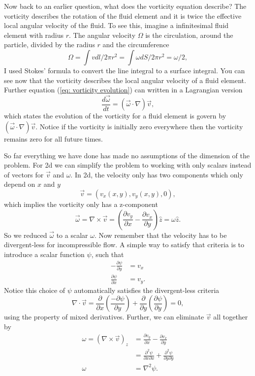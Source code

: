 \documentclass{article}
\begin{document}
Now back to an earlier question, what does the vorticity equation describe? The vorticity describes the rotation of the fluid element and it is twice the effective local angular velocity of the fluid. To see this, imagine a infinitesimal fluid element with radius $r$. The angular velocity $\Omega$ is the circulation, around the particle, divided by the radius $r$ and the circumference
\begin{equation*}
\Omega = \int v dl/2\pi r^2 = \int \omega dS/ 2\pi r^2 = \omega/2, 
\end{equation*}
I used Stokes' formula to convert the line integral to a surface integral. You can see now that the vorticity describes the local angular velocity of a fluid element. Further equation (\ref{eq: vorticity evolution}) can written in a Lagrangian version
\begin{equation*}
\frac{d\vec{\omega}}{dt} = (\vec{\omega}\cdot\nabla)\vec{v},
\end{equation*}
which states the evolution of the vorticity for a fluid element is govern by $(\vec{\omega}\cdot\nabla)\vec{v}$. Notice if the vorticity is initially zero everywhere then the vorticity remains zero for all future times.

So far everything we have done has made no assumptions of the dimension of the problem. For 2d we can simplify the problem to working with only scalars instead of vectors for $\vec{v}$ and $\omega$. In 2d, the velocity only has two components which only depend on $x$ and $y$
\begin{equation*}
\vec{v} = (v_x(x,y), v_y(x,y),0),
\end{equation*} 
which implies the vorticity only has a z-component
\begin{equation*}
\vec{\omega}=\nabla\times\vec{v} = \left(\frac{\partial v_y}{\partial x} - \frac{\partial v_x}{\partial y}\right)\hat{z} = \omega \hat{z}.
\end{equation*}
So we reduced $\vec{\omega}$ to a scalar $\omega$. Now remember that the velocity has to be divergent-less for incompressible flow. A simple way to satisfy that criteria is to introduce a scalar function $\psi$, such that
\begin{align*}
-\frac{\partial \psi}{\partial y} &= v_x\\
\frac{\partial \psi}{\partial x} &= v_y.
\end{align*}
Notice this choice of $\psi$ automatically satisfies the divergent-less criteria
\begin{equation}
\nabla\cdot\vec{v} = \frac{\partial}{\partial x}\left(\frac{-\partial \psi}{\partial y}\right) + \frac{\partial}{\partial y}\left(\frac{\partial \psi}{\partial y}\right) = 0,
\end{equation} 
using the property of mixed derivatives. Further, we can eliminate $\vec{v}$ all together by
\begin{align*}
\omega = (\nabla\times\vec{v})_z &= \frac{\partial v_y}{\partial x} - \frac{\partial v_x}{\partial y}\\
&=\frac{\partial^2 \psi}{\partial x\partial x} + \frac{\partial^2 \psi}{\partial y\partial y}\\
\omega &= \nabla^2 \psi.
\end{align*}
\end{document}
